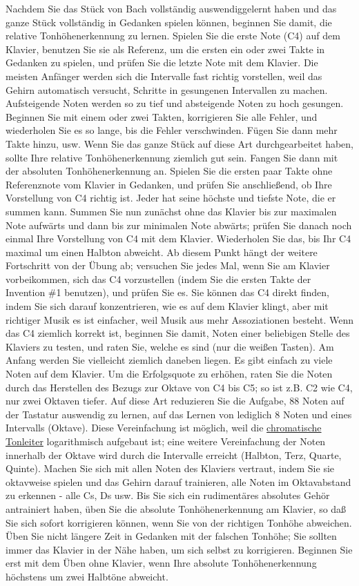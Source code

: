 Nachdem Sie das Stück von Bach vollständig auswendiggelernt haben und das ganze Stück vollständig in Gedanken spielen können, beginnen Sie damit, die relative Tonhöhenerkennung zu lernen.
Spielen Sie die erste Note (C4) auf dem Klavier, benutzen Sie sie als Referenz, um die ersten ein oder zwei Takte in Gedanken zu spielen, und prüfen Sie die letzte Note mit dem Klavier.
Die meisten Anfänger werden sich die Intervalle fast richtig vorstellen, weil das Gehirn automatisch versucht, Schritte in gesungenen Intervallen zu machen.
Aufsteigende Noten werden so zu tief und absteigende Noten zu hoch gesungen.
Beginnen Sie mit einem oder zwei Takten, korrigieren Sie alle Fehler, und wiederholen Sie es so lange, bis die Fehler verschwinden.
Fügen Sie dann mehr Takte hinzu, usw.
Wenn Sie das ganze Stück auf diese Art durchgearbeitet haben, sollte Ihre relative Tonhöhenerkennung ziemlich gut sein.
Fangen Sie dann mit der absoluten Tonhöhenerkennung an.
Spielen Sie die ersten paar Takte ohne Referenznote vom Klavier in Gedanken, und prüfen Sie anschließend, ob Ihre Vorstellung von C4 richtig ist.
Jeder hat seine höchste und tiefste Note, die er summen kann.
Summen Sie nun zunächst ohne das Klavier bis zur maximalen Note aufwärts und dann bis zur minimalen Note abwärts; prüfen Sie danach noch einmal Ihre Vorstellung von C4 mit dem Klavier.
Wiederholen Sie das, bis Ihr C4 maximal um einen Halbton abweicht.
Ab diesem Punkt hängt der weitere Fortschritt von der Übung ab; versuchen Sie jedes Mal, wenn Sie am Klavier vorbeikommen, sich das C4 vorzustellen (indem Sie die ersten Takte der Invention \#1 benutzen), und prüfen Sie es.
Sie können das C4 direkt finden, indem Sie sich darauf konzentrieren, wie es auf dem Klavier klingt, aber mit richtiger Musik es ist einfacher, weil Musik aus mehr Assoziationen besteht.
Wenn das C4 ziemlich korrekt ist, beginnen Sie damit, Noten einer beliebigen Stelle des Klaviers zu testen, und raten Sie, welche es sind (nur die weißen Tasten).
Am Anfang werden Sie vielleicht ziemlich daneben liegen.
Es gibt einfach zu viele Noten auf dem Klavier.
Um die Erfolgsquote zu erhöhen, raten Sie die Noten durch das Herstellen des Bezugs zur Oktave von C4 bis C5; so ist z.B. C2 wie C4, nur zwei Oktaven tiefer.
Auf diese Art reduzieren Sie die Aufgabe, 88 Noten auf der Tastatur auswendig zu lernen, auf das Lernen von lediglich 8 Noten und eines Intervalls (Oktave).
Diese Vereinfachung ist möglich, weil die \hyperlink{c2_2}{chromatische Tonleiter} logarithmisch aufgebaut ist; eine weitere Vereinfachung der Noten innerhalb der Oktave wird durch die Intervalle erreicht (Halbton, Terz, Quarte, Quinte).
Machen Sie sich mit allen Noten des Klaviers vertraut, indem Sie sie oktavweise spielen und das Gehirn darauf trainieren, alle Noten im Oktavabstand zu erkennen - alle Cs, Ds usw.
Bis Sie sich ein rudimentäres absolutes Gehör antrainiert haben, üben Sie die absolute Tonhöhenerkennung am Klavier, so daß Sie sich sofort korrigieren können, wenn Sie von der richtigen Tonhöhe abweichen.
Üben Sie nicht längere Zeit in Gedanken mit der falschen Tonhöhe; Sie sollten immer das Klavier in der Nähe haben, um sich selbst zu korrigieren.
Beginnen Sie erst mit dem Üben ohne Klavier, wenn Ihre absolute Tonhöhenerkennung höchstens um zwei Halbtöne abweicht.

